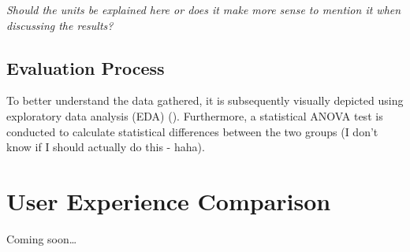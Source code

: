 \textit{Should the units be explained here or does it make more sense to mention it when discussing the results?}


\subsection{Evaluation Process} \label{subsection::evaluation_process}
To better understand the data gathered, it is subsequently visually depicted using exploratory data analysis (EDA) (\cite{Tukey1977}). 
Furthermore, a statistical ANOVA test is conducted to calculate statistical differences between the two groups (I don't know if I should actually do this - haha).


\section{User Experience Comparison} \label{section::usability_comparison_design}
Coming soon\dots